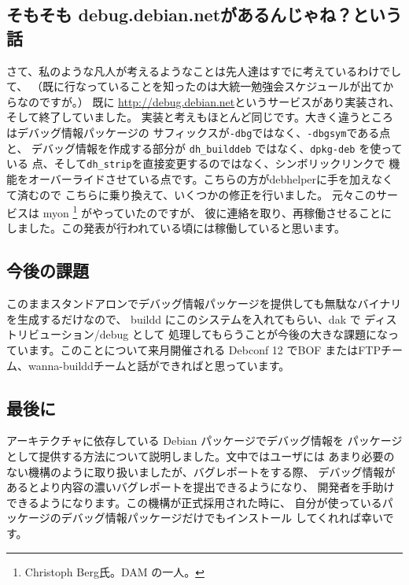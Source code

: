 \documentclass[mingoth,a4paper]{jsarticle}
\begin{document}
\subsection{そもそも debug.debian.netがあるんじゃね？という話}
さて、私のような凡人が考えるようなことは先人達はすでに考えているわけでして、
（既に行なっていることを知ったのは大統一勉強会スケジュールが出てからなのですが。）
既に \url{http://debug.debian.net}というサービスがあり実装され、そして終了していました。
実装と考えもほとんど同じです。大きく違うところはデバッグ情報パッケージの
サフィックスが\texttt{-dbg}ではなく、\texttt{-dbgsym}である点と、
デバッグ情報を作成する部分が \texttt{dh\_builddeb} ではなく、\texttt{dpkg-deb} を使っている
点、そして\texttt{dh\_strip}を直接変更するのではなく、シンボリックリンクで
機能をオーバーライドさせている点です。こちらの方がdebhelperに手を加えなくて済むので
こちらに乗り換えて、いくつかの修正を行いました。
元々このサービスは myon \footnote{Christoph Berg氏。DAM の一人。} がやっていたのですが、
彼に連絡を取り、再稼働させることにしました。この発表が行われている頃には稼働していると思います。

\subsection{今後の課題}

このままスタンドアロンでデバッグ情報パッケージを提供しても無駄なバイナリを生成するだけなので、
buildd にこのシステムを入れてもらい、dak で ディストリビューション/debug として
処理してもらうことが今後の大きな課題になっています。このことについて来月開催される Debconf 12
でBOF またはFTPチーム、wanna-builddチームと話ができればと思っています。

\subsection{最後に}
アーキテクチャに依存している Debian パッケージでデバッグ情報を
パッケージとして提供する方法について説明しました。文中ではユーザには
あまり必要のない機構のように取り扱いましたが、バグレポートをする際、
デバッグ情報があるとより内容の濃いバグレポートを提出できるようになり、
開発者を手助けできるようになります。この機構が正式採用された時に、
自分が使っているパッケージのデバッグ情報パッケージだけでもインストール
してくれれば幸いです。

\label{sec:Rabbit}
\end{document}
